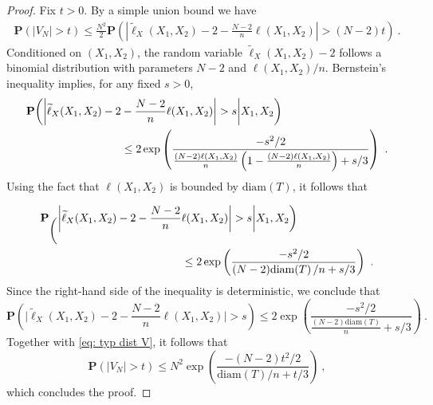 \documentclass[12pt]{article}
\newcommand{\prob}[1]{\mathbf{P}\left( #1 \right)}
\newcommand{\diam}[1]{\mathrm{diam}\!\left(#1\right)}
\begin{document}
\begin{proof}
Fix $t>0$. By a simple union bound we have
\begin{align}
    \prob{|V_N|>t} \le \frac{N^2}{2}\prob{\left| \widetilde{\ell}_X(X_1,X_2) -2- \frac{N-2}{n}\ell(X_1,X_2)\right|>(N-2)t} ~.\label{eq: typ dist V}
\end{align}
Conditioned on $(X_1,X_2)$, the random variable $\widetilde{\ell}_X(X_1,X_2)-2$ follows a binomial distribution with parameters $N-2$ and $\ell(X_1,X_2)/n$. Bernstein's inequality implies, for any fixed $s>0$,
\begin{align*}
    \mathbf{P}\bigg( \bigg| \widetilde{\ell}_X(X_1,X_2)- 2& - \frac{N-2}{n}\ell(X_1,X_2)\bigg|>s \bigg{|} X_1,X_2\bigg)  \\
    &\le 2\exp \left( \frac{-s^2/2}{\frac{(N-2)\ell(X_1,X_2)}{n}\left(1-\frac{(N-2)\ell(X_1,X_2)}{n}\right)+s/3} \right)~.
\end{align*}
Using the fact that $\ell(X_1,X_2)$ is bounded by $\diam{T}$, it follows that 

\begin{align*}
    \mathbf{P}_\bigg( \bigg| \widetilde{\ell}_X(X_1,X_2)- 2 - \frac{N-2}{n}&\ell(X_1,X_2)\bigg|>s\bigg{|} X_1,X_2 \bigg) \nonumber \\
    &\le 2\exp \left(\frac{-s^2/2}{(N-2)\diam{T}/n + s/3} \right)~.
\end{align*}
Since the right-hand side of the inequality is deterministic, we conclude that 
\begin{equation*}
\prob{\bigg| \widetilde{\ell}_X(X_1,X_2)- 2 - \frac{N-2}{n}\ell(X_1,X_2)\bigg|>s} \le 2\exp \left(\frac{-s^2/2}{\frac{(N-2)\diam{T}}{n} + s/3} \right)~.
\end{equation*}
Together with \eqref{eq: typ dist V}, it follows that
\begin{equation}
    \prob{|V_N|>t} \le N^2\exp \left(\frac{-(N-2)t^2/2}{\diam{T}/n + t/3} \right)~,
\end{equation}
which concludes the proof.

\end{proof}





\end{document}
